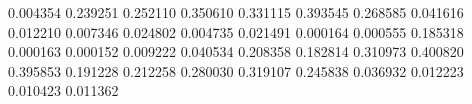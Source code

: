 0.004354
0.239251
0.252110
0.350610
0.331115
0.393545
0.268585
0.041616
0.012210
0.007346
0.024802
0.004735
0.021491
0.000164
0.000555
0.185318
0.000163
0.000152
0.009222
0.040534
0.208358
0.182814
0.310973
0.400820
0.395853
0.191228
0.212258
0.280030
0.319107
0.245838
0.036932
0.012223
0.010423
0.011362

